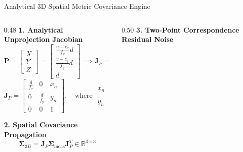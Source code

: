 \documentclass[aspectratio=169, 10pt]{beamer}
\begin{document}
\begin{frame}{Analytical 3D Spatial Metric Covariance Engine}
  \begin{columns}[T]
    \begin{column}{0.48\textwidth}
      {\small \textbf{\textcolor{NavyBlue}{1. Analytical Unprojection Jacobian}}}
      \begin{equation}
        \mathbf{P} = \begin{bmatrix} X \\ Y \\ Z \end{bmatrix} = \begin{bmatrix} \frac{u - c_x}{f_x} d \\[3pt] \frac{v - c_y}{f_y} d \\[3pt] d \end{bmatrix} \implies \mathbf{J}_P = \frac{\partial \mathbf{P}}{\partial [u, v, d]}
      \end{equation}
      \begin{equation}
        \mathbf{J}_P = \begin{bmatrix} \frac{d}{f_x} & 0 & x_n \\[3pt] 0 & \frac{d}{f_y} & y_n \\[3pt] 0 & 0 & 1 \end{bmatrix}, \quad \text{where } \begin{aligned} x_n &= \frac{u - c_x}{f_x} \\ y_n &= \frac{v - c_y}{f_y} \end{aligned}
      \end{equation}

      \vspace{0.1cm}
      {\small \textbf{\textcolor{NavyBlue}{2. Spatial Covariance Propagation}}}
      \begin{equation}
        \mathbf{\Sigma}_{3D} = \mathbf{J}_P \mathbf{\Sigma}_{\text{meas}} \mathbf{J}_P^T \in \mathbb{R}^{3 \times 3}
      \end{equation}
    \end{column}

    \begin{column}{0.50\textwidth}
      {\small \textbf{\textcolor{NavyBlue}{3. Two-Point Correspondence Residual Noise}}}
      \vspace{0.1cm}


\end{column}
\end{columns}
\end{frame}
\end{document}
